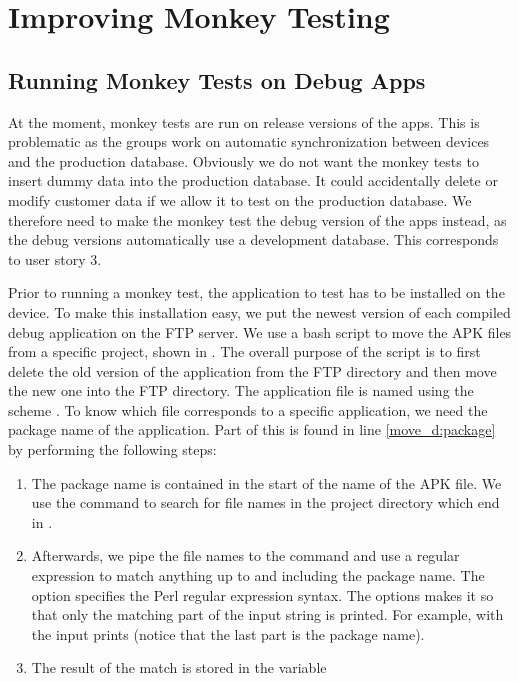 \chapter{Improving Monkey Testing}
\dummy

\section{Running Monkey Tests on Debug Apps}
At the moment, monkey tests are run on release versions of the apps. This is problematic as the \db{} groups work on automatic synchronization between devices and the production database. Obviously we do not want the monkey tests to insert dummy data into the production database. It could accidentally delete or modify customer data if we allow it to test on the production database. We therefore need to make the monkey test the debug version of the apps instead, as the debug versions automatically use a development database. This corresponds to user story 3.

Prior to running a monkey test, the application to test has to be installed on the device. To make this installation easy, we put the newest version of each compiled debug application on the FTP server. We use a bash script to move the APK files from a specific project, shown in . The overall purpose of the script is to first delete the old version of the application from the FTP directory and then move the new one into the FTP directory. The application file is named using the scheme . To know which file corresponds to a specific application, we need the package name of the application. Part of this is found in line \ref{move_d:package} by performing the following steps:

\begin{enumerate}
  \item The package name is contained in the start of the name of the APK file. We use the  command to search for file names in the project directory which end in .
  \item Afterwards, we pipe the file names to the  command and use a regular expression to match anything up to and including the package name. The  option specifies the Perl regular expression syntax. The  options makes it so that only the matching part of the input string is printed. For example,  with the input  prints  (notice that the last part is the package name).
  \item The result of the match is stored in the variable 
\end{enumerate}

